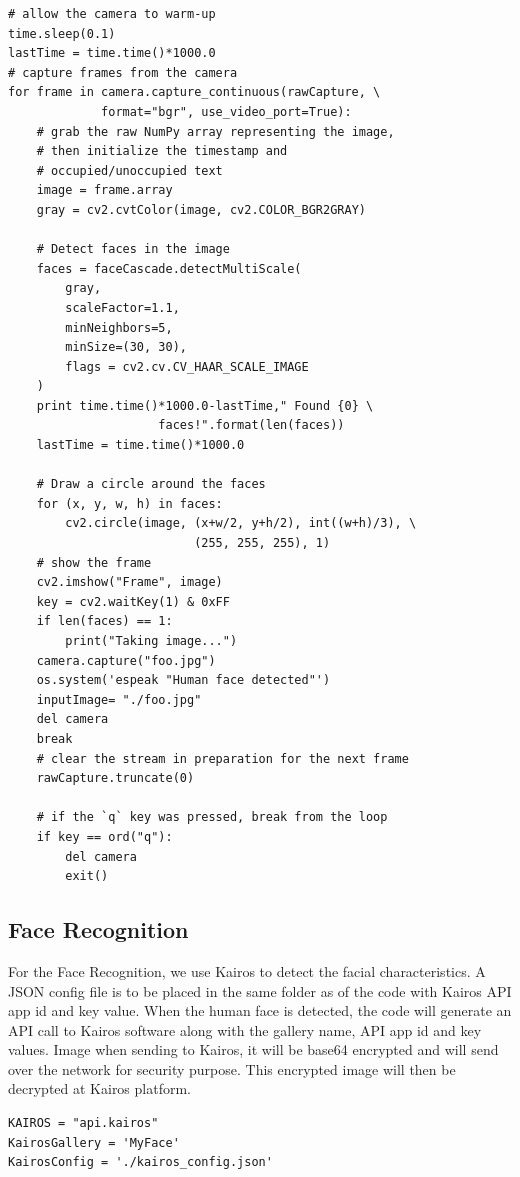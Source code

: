 \documentclass[sigconf]{acmart}
\begin{document}
\begin{verbatim}
# allow the camera to warm-up
time.sleep(0.1)
lastTime = time.time()*1000.0
# capture frames from the camera
for frame in camera.capture_continuous(rawCapture, \ 
             format="bgr", use_video_port=True):
	# grab the raw NumPy array representing the image, 
	# then initialize the timestamp and 
	# occupied/unoccupied text
    image = frame.array
    gray = cv2.cvtColor(image, cv2.COLOR_BGR2GRAY)
    
    # Detect faces in the image
    faces = faceCascade.detectMultiScale(
    	gray,
    	scaleFactor=1.1,
    	minNeighbors=5,
    	minSize=(30, 30),
    	flags = cv2.cv.CV_HAAR_SCALE_IMAGE
    )
    print time.time()*1000.0-lastTime," Found {0} \ 
                     faces!".format(len(faces))
    lastTime = time.time()*1000.0

    # Draw a circle around the faces
    for (x, y, w, h) in faces:
        cv2.circle(image, (x+w/2, y+h/2), int((w+h)/3), \ 
                          (255, 255, 255), 1)
    # show the frame
    cv2.imshow("Frame", image)
    key = cv2.waitKey(1) & 0xFF
    if len(faces) == 1:
        print("Taking image...")
	camera.capture("foo.jpg")
	os.system('espeak "Human face detected"')
	inputImage= "./foo.jpg"
	del camera
	break 
	# clear the stream in preparation for the next frame
    rawCapture.truncate(0)
    
	# if the `q` key was pressed, break from the loop
    if key == ord("q"):
        del camera
        exit()
\end{verbatim}


\subsection{Face Recognition}
For the Face Recognition, we use Kairos to detect the facial characteristics. A JSON config file is to be placed in the same folder as of the code with Kairos API app id and key value. When the human face is detected, the code will generate an API call to Kairos software along with the gallery name, API app id and key values. Image when sending to Kairos, it will be base64 encrypted and will send over the network for security purpose. This encrypted image will then be decrypted at Kairos platform.


\begin{verbatim}
KAIROS = "api.kairos"
KairosGallery = 'MyFace'
KairosConfig = './kairos_config.json'
\end{verbatim}
\end{document}
